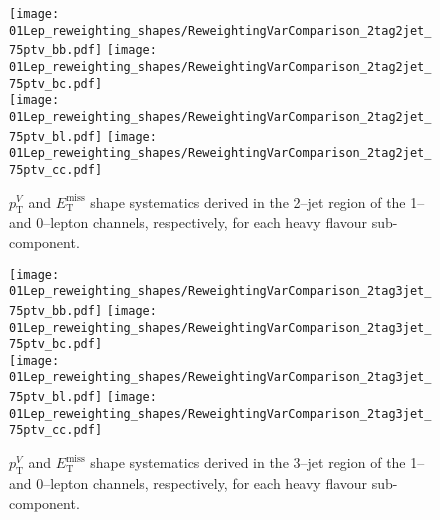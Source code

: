 \begin{figure}[ht!]
  \centering
  \texttt{[image: 01Lep\_reweighting\_shapes/ReweightingVarComparison\_2tag2jet\_75ptv\_bb.pdf]}
  \texttt{[image: 01Lep\_reweighting\_shapes/ReweightingVarComparison\_2tag2jet\_75ptv\_bc.pdf]}
  \\
  \texttt{[image: 01Lep\_reweighting\_shapes/ReweightingVarComparison\_2tag2jet\_75ptv\_bl.pdf]}
  \texttt{[image: 01Lep\_reweighting\_shapes/ReweightingVarComparison\_2tag2jet\_75ptv\_cc.pdf]}
  \\
  \caption[A comparison of 0-- and 1--lepton channel derived $p_{\mathrm{T}}^V$ and
  $E_{\mathrm{T}}^{\text{miss}}$ shape systematic uncertainties on $W+$jets events (2--jet
  category).]{$p_{\mathrm{T}}^V$ and $E_{\mathrm{T}}^{\text{miss}}$ shape systematics derived in the
    2--jet region of the 1-- and 0--lepton channels, respectively, for each
    heavy flavour sub-component.}
  \label{fig:wjets_01lep_2jet_SysWPtVBDTr}
\end{figure}

\begin{figure}[ht!]
  \centering
  \texttt{[image: 01Lep\_reweighting\_shapes/ReweightingVarComparison\_2tag3jet\_75ptv\_bb.pdf]}
  \texttt{[image: 01Lep\_reweighting\_shapes/ReweightingVarComparison\_2tag3jet\_75ptv\_bc.pdf]}
  \\
  \texttt{[image: 01Lep\_reweighting\_shapes/ReweightingVarComparison\_2tag3jet\_75ptv\_bl.pdf]}
  \texttt{[image: 01Lep\_reweighting\_shapes/ReweightingVarComparison\_2tag3jet\_75ptv\_cc.pdf]}
  \\
  \caption[A comparison of 0-- and 1--lepton channel derived $p_{\mathrm{T}}^V$ and
  $E_{\mathrm{T}}^{\text{miss}}$ shape systematic uncertainties on $W+$jets events (3--jet
  category).]{$p_{\mathrm{T}}^V$ and $E_{\mathrm{T}}^{\text{miss}}$ shape systematics derived in the
    3--jet region of the 1-- and 0--lepton channels, respectively, for each
    heavy flavour sub-component.}
  \label{fig:wjets_01lep_3jet_SysWPtVBDTr}
\end{figure}
